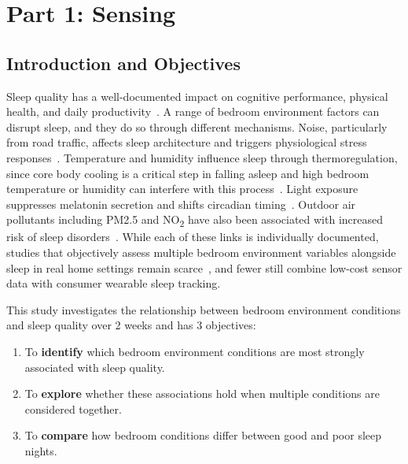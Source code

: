 \documentclass[10pt,a4paper]{extarticle}
\begin{document}
\section*{Part 1: Sensing}
\setcounter{section}{1}
\setcounter{subsection}{0}

\subsection{Introduction and Objectives}

Sleep quality has a well-documented impact on cognitive performance, physical health, and daily productivity~\citep{medic2017}. A range of bedroom environment factors can disrupt sleep, and they do so through different mechanisms. Noise, particularly from road traffic, affects sleep architecture and triggers physiological stress responses~\citep{muzet2007,halperin2014}. Temperature and humidity influence sleep through thermoregulation, since core body cooling is a critical step in falling asleep and high bedroom temperature or humidity can interfere with this process~\citep{caddick2018}. Light exposure suppresses melatonin secretion and shifts circadian timing~\citep{yasmeen2025}. Outdoor air pollutants including PM2.5 and NO\textsubscript{2} have also been associated with increased risk of sleep disorders~\citep{zhao2024}. While each of these links is individually documented, studies that objectively assess multiple bedroom environment variables alongside sleep in real home settings remain scarce~\citep{basner2023}, and fewer still combine low-cost sensor data with consumer wearable sleep tracking.

\begin{tcolorbox}[
  colback=imperialblue!5,
  colframe=imperialblue,
  leftrule=3pt,
  rightrule=0pt,
  toprule=0pt,
  bottomrule=0pt,
  boxsep=4pt,
  left=8pt,
  right=8pt,
  sharp corners
]
This study investigates the relationship between bedroom environment conditions and sleep quality over 2 weeks and has 3 objectives:
\begin{enumerate}[nosep]
    \item To \textbf{identify} which bedroom environment conditions are most strongly associated with sleep quality.
    \item To \textbf{explore} whether these associations hold when multiple conditions are considered together.
    \item To \textbf{compare} how bedroom conditions differ between good and poor sleep nights.
\end{enumerate}
\end{tcolorbox}
\end{document}
